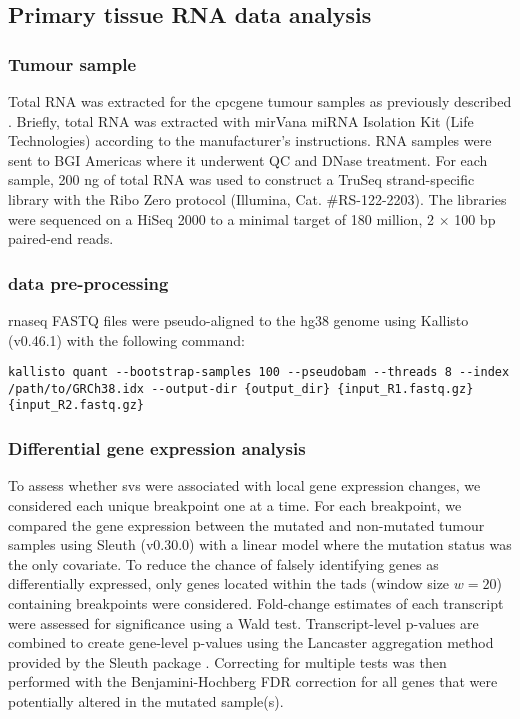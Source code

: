 \subsection{Primary tissue RNA data analysis}

\subsubsection{Tumour sample }

Total RNA was extracted for the \gls{cpcgene} tumour samples as previously described \cite{chenWidespreadFunctionalRNA2019}.
Briefly, total RNA was extracted with mirVana miRNA Isolation Kit (Life Technologies) according to the manufacturer's instructions.
RNA samples were sent to BGI Americas where it underwent QC and DNase treatment.
For each sample, 200 ng of total RNA was used to construct a TruSeq strand-specific library with the Ribo Zero protocol (Illumina, Cat. \#RS-122-2203).
The libraries were sequenced on a HiSeq 2000 to a minimal target of 180 million, 2 $\times$ 100 bp paired-end reads.

\subsubsection{ data pre-processing}

\gls{rnaseq} FASTQ files were pseudo-aligned to the hg38 genome using Kallisto (v0.46.1) \cite{brayNearoptimalProbabilisticRNAseq2016} with the following command:

\begin{lstlisting}[basicstyle=\ttfamily]
kallisto quant --bootstrap-samples 100 --pseudobam --threads 8 --index /path/to/GRCh38.idx --output-dir {output_dir} {input_R1.fastq.gz} {input_R2.fastq.gz}
\end{lstlisting}

\subsubsection{Differential gene expression analysis}

To assess whether \glspl{sv} were associated with local gene expression changes, we considered each unique breakpoint one at a time.
For each breakpoint, we compared the gene expression between the mutated and non-mutated tumour samples using Sleuth (v0.30.0) \cite{pimentelDifferentialAnalysisRNAseq2017,yiGenelevelDifferentialAnalysis2018} with a linear model where the mutation status was the only covariate.
To reduce the chance of falsely identifying genes as differentially expressed, only genes located within the \glspl{tad} (window size  $w = 20$) containing breakpoints were considered.
Fold-change estimates of each transcript were assessed for significance using a Wald test.
Transcript-level p-values are combined to create gene-level p-values using the Lancaster aggregation method provided by the Sleuth package \cite{yiGenelevelDifferentialAnalysis2018}.
Correcting for multiple tests was then performed with the Benjamini-Hochberg FDR correction for all genes that were potentially altered in the mutated sample(s).
